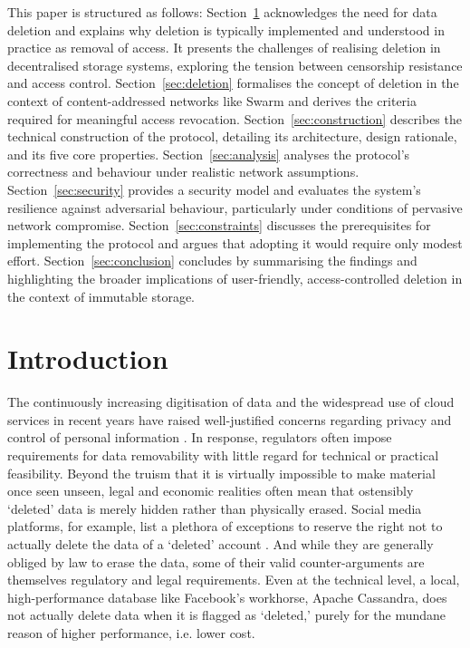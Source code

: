 \documentclass[singlecolumn]{acmart}
\begin{document}
This paper is structured as follows:
Section~\ref{sec:intro} acknowledges the need for data deletion and explains why deletion is  typically implemented and understood in practice as removal of access. It presents the challenges of realising deletion in decentralised storage systems, exploring the tension between censorship resistance and access control.
Section~\ref{sec:deletion} formalises the concept of deletion in the context of content-addressed networks like Swarm and derives the criteria required for meaningful access revocation.
Section~\ref{sec:construction} describes the technical construction of the protocol, detailing its architecture, design rationale, and its five core properties.
Section~\ref{sec:analysis} analyses the protocol’s correctness and behaviour under realistic network assumptions.
Section~\ref{sec:security} provides a security model and evaluates the system’s resilience against adversarial behaviour, particularly under conditions of pervasive network compromise.
Section~\ref{sec:constraints} discusses the prerequisites for implementing the protocol and argues that adopting it would require only modest effort.
Section~\ref{sec:conclusion} concludes by summarising the findings and highlighting the broader implications of user-friendly, access-controlled deletion in the context of immutable storage.

\section{Introduction} \label{sec:intro}

The continuously increasing digitisation of data and the widespread use of cloud services in recent years have raised well-justified concerns regarding privacy and control of personal information \cite{voigt2017gdpr}. 
In  response, regulators often impose requirements for data removability  with little regard for technical or practical feasibility. Beyond the truism that it is virtually impossible to make material once seen unseen, legal and economic realities often mean that ostensibly `deleted' data is merely hidden rather than physically erased. Social media platforms, for example, list a plethora of exceptions to reserve the right not to actually delete the data of a `deleted' account \cite{facebook2025privacy}. And while they are generally obliged by law to erase the data, some of their valid counter-arguments are themselves regulatory and legal requirements. Even at the technical level, a local, high-performance database like Facebook's workhorse, Apache Cassandra, does not actually delete data \cite{apache2025cassandra} when it is flagged as `deleted,' purely for the mundane reason of higher performance, i.e. lower cost.
\end{document}
